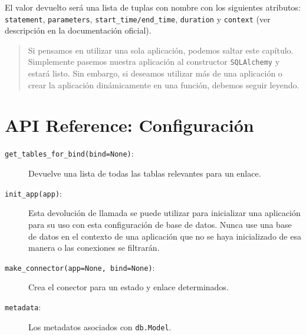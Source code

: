 \documentclass[11pt,letterpaper,notumble]{leaflet}
\begin{document}
{{\begin{minipage}{1.5\linewidth}
            El valor devuelto será una lista de tuplas con nombre con los siguientes atributos: \texttt{statement}, \texttt{parameters}, \texttt{start\_time/end\_time}, \texttt{duration} y \texttt{context} (ver descripción en la documentación oficial).
    		
        \end{minipage}

    }}
    
    \newpage %
    
    \mbox{}
    
    \newpage %
    
    \maketitle
    
    \begin{abstract}
    	Si pensamos en utilizar una sola aplicación, podemos saltar este capítulo. Simplemente pasemos nuestra aplicación al constructor \texttt{SQLAlchemy} y estará listo. Sin embargo, si deseamos utilizar más de una aplicación o crear la aplicación dinámicamente en una función, debemos seguir leyendo.
    \end{abstract}

    \section{API Reference: Configuración}
    
    \begin{description}
    	\item[\texttt{get\_tables\_for\_bind(bind=None)}:] Devuelve una lista de todas las tablas relevantes para un enlace.
    	
    	\item[\texttt{init\_app(app)}:] Esta devolución de llamada se puede utilizar para inicializar una aplicación para su uso con esta configuración de base de datos. Nunca use una base de datos en el contexto de una aplicación que no se haya inicializado de esa manera o las conexiones se filtrarán.
    	
    	\item[\texttt{make\_connector(app=None, bind=None)}:]
    	Crea el conector para un estado y enlace determinados.
    	
    	\item[\texttt{metadata}:]
    	Los metadatos asociados con \texttt{db.Model}.
    \end{description}
\end{document}
